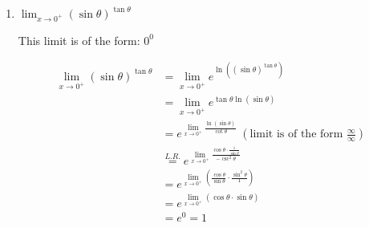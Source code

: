 \documentclass[nooutcomes]{ximera}
\begin{document}
\begin{problem}
\begin{enumerate}
    
    \item $\lim_{x \to 0^+} (\sin\theta)^{\tan\theta}$
        \begin{freeResponse}
    This limit is of the form: $0^0$
    
     \begin{align*}
        \lim_{x \to 0^+} (\sin\theta)^{\tan\theta} &= \lim_{x \to 0^+} e^{\ln \left((\sin\theta)^{\tan\theta} \right) } \\
                                            &= \lim_{x \to 0^+} e^{\tan\theta \ln (\sin\theta) } \\
                                            &= e^{ \lim_{x \to 0^+} \frac{\ln (\sin\theta)}{\cot\theta} } \; \left( \text{limit is of the form } \frac{\infty}{\infty} \right) \\
                                            &\stackrel{L.R.}{=} e^{\lim_{x \to 0^+}\frac{\cos\theta \cdot \frac{1}{\sin\theta}}{-\csc^2\theta}} \\
                                            &= e^{\lim_{x \to 0^+} \left(\frac{\cos\theta}{\sin\theta}\cdot\frac{\sin^2\theta}{1}\right)} \\
                                              &= e^{\lim_{x \to 0^+} (\cos\theta\cdot\sin\theta)} \\
                                            &= e^0=1
        \end{align*}
    \end{freeResponse}
    

    
  \end{enumerate}
\end{problem}
\end{document}
